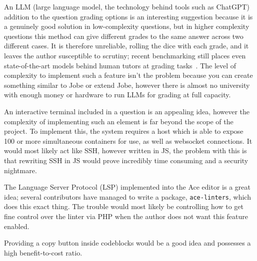 An LLM (large language model, the technology behind tools such as ChatGPT) addition to the question grading options is an interesting suggestion because it is a genuinely good solution in low-complexity questions, but in higher complexity questions this method can give different grades to the same answer across two different cases. It is therefore unreliable, rolling the dice with each grade, and it leaves the author susceptible to scrutiny; recent benchmarking still places even state-of-the-art models behind human tutors at grading tasks~\cite{llmgrading}. The level of complexity to implement such a feature isn't the problem because you can create something similar to Jobe or extend Jobe, however there is almost no university with enough money or hardware to run LLMs for grading at full capacity.

An interactive terminal included in a question is an appealing idea, however the complexity of implementing such an element is far beyond the scope of the project. To implement this, the system requires a host which is able to expose 100 or more simultaneous containers for use, as well as websocket connections. It would most likely act like SSH, however written in JS, the problem with this is that rewriting SSH in JS would prove incredibly time consuming and a security nightmare.

The Language Server Protocol (LSP) implemented into the Ace editor is a great idea; several contributors have managed to write a package, \texttt{ace-linters}, which does this exact thing. The trouble would most likely be controlling how to get fine control over the linter via PHP when the author does not want this feature enabled.

Providing a copy button inside codeblocks would be a good idea and possesses a high benefit-to-cost ratio.

